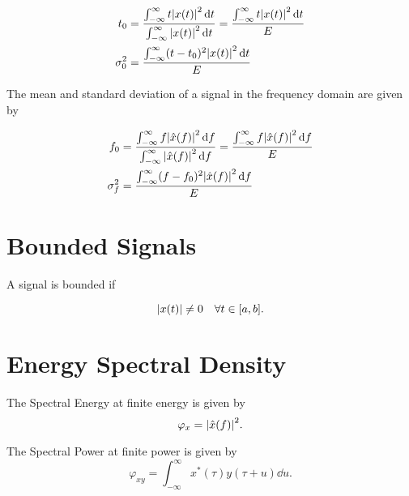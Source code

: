 \documentclass{report}
\newcommand{\Ft}[1]{\SF_t\!\lt\{ #1 \rt\}}
\begin{document}
\begin{align*}
	t_0        & = \frac{\int_{-\infty}^\infty t \abs{x(t)}^2 \dd{t}}{\int_{-\infty}^\infty \abs{x(t)}^2 \dd{t}} = \frac{\int_{-\infty}^\infty t \abs{x(t)}^2 \dd{t}}{E} \\
	\sigma_0^2 & = \frac{\int_{-\infty}^\infty (t-t_0)^2 \abs{x(t)}^2 \dd{t}}{E}
\end{align*}

The mean and standard deviation of a signal in the frequency domain are given by

\begin{align*}
	f_0        & = \frac{\int_{-\infty}^\infty f \abs{\hat{x}(f)}^2 \dd{f}}{\int_{-\infty}^\infty \abs{\hat{x}(f)}^2 \dd{f}} = \frac{\int_{-\infty}^\infty f \abs{\hat{x}(f)}^2 \dd{f}}{E} \\
	\sigma_f^2 & = \frac{\int_{-\infty}^\infty (f-f_0)^2 \abs{\hat{x}(f)}^2 \dd{f}}{E}
\end{align*}


\section{Bounded Signals}

A signal is bounded if

\[
	\abs{x(t)} \neq 0 \quad \forall t \in [a,b]
	.\]


\section{Energy Spectral Density}

\nt{
	\[
		\Ft{\varphi_{xy}} = \Ft{x^*(-\tau) * y(\tau)} = \hat{x}(f)\hat{y}(f) \implies \varphi_{x} = \abs{\hat{x}(f)}^2 = \phi_{x}
		.\]
}

The Spectral Energy at finite energy is given by
\[
	\varphi_{x} = \abs{\hat{x}(f)}^2
	.\]

The Spectral Power at finite power is given by
\[
	\varphi_{xy} = \int_{-\infty}^{\infty} x^*(\tau) y(\tau + u) \dd{u}
	.\]
\end{document}
